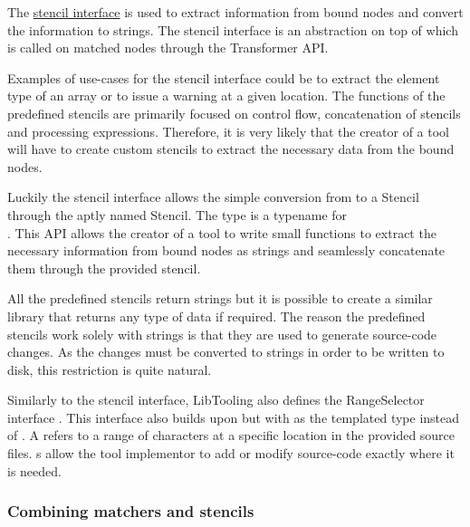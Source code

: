 The \href{https://github.com/llvm/llvm-project/blob/main/clang/include/clang/Tooling/Transformer/Stencil.h}{stencil interface} is used to extract information from bound nodes and convert the information to strings. The stencil interface is an abstraction on top of  which is called on matched nodes through the Transformer API. 

Examples of use-cases for the stencil interface could be to extract the element type of an array or to issue a warning at a given location. The functions of the predefined stencils are primarily focused on control flow, concatenation of stencils and processing expressions. Therefore, it is very likely that the creator of a tool will have to create custom stencils to extract the necessary data from the bound nodes.

Luckily the stencil interface allows the simple conversion from  to a Stencil through the aptly named  Stencil. The  type is a typename for \\ . This API allows the creator of a tool to write small functions to extract the necessary information from bound nodes as strings and seamlessly concatenate them through the provided  stencil.

All the predefined stencils return strings but it is possible to create a similar library that returns any type of data if required. The reason the predefined stencils work solely with strings is that they are used to generate source-code changes. As the changes must be converted to strings in order to be written to disk, this restriction is quite natural. 

Similarly to the stencil interface, LibTooling also defines the RangeSelector interface \cite{clangRangeSelectorLibraryLibTooling2023}.
This interface also builds upon  but with  as the templated type instead of . A  refers to a range of characters at a specific location in the provided source files. s allow the tool implementor to add or modify source-code exactly where it is needed.

\subsubsection*{Combining matchers and stencils}

